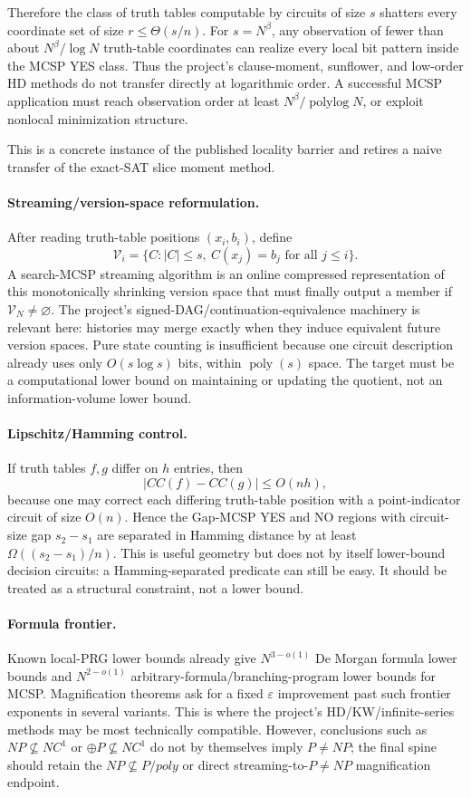 \documentclass[11pt]{article}
\begin{document}
Therefore the class of truth tables computable by circuits of size $s$ shatters every coordinate set of size $r\le\Theta(s/n)$. For $s=N^\beta$, any observation of fewer than about $N^\beta/\log N$ truth-table coordinates can realize every local bit pattern inside the MCSP YES class. Thus the project's clause-moment, sunflower, and low-order HD methods do not transfer directly at logarithmic order. A successful MCSP application must reach observation order at least $N^\beta/\operatorname{polylog}N$, or exploit nonlocal minimization structure.

This is a concrete instance of the published locality barrier and retires a naive transfer of the exact-SAT slice moment method.

\paragraph{Streaming/version-space reformulation.}
After reading truth-table positions $(x_i,b_i)$, define
\[\mathcal V_i=\{C:|C|\le s,\ C(x_j)=b_j\text{ for all }j\le i\}.\]
A search-MCSP streaming algorithm is an online compressed representation of this monotonically shrinking version space that must finally output a member if $\mathcal V_N\ne\varnothing$. The project's signed-DAG/continuation-equivalence machinery is relevant here: histories may merge exactly when they induce equivalent future version spaces. Pure state counting is insufficient because one circuit description already uses only $O(s\log s)$ bits, within $\operatorname{poly}(s)$ space. The target must be a computational lower bound on maintaining or updating the quotient, not an information-volume lower bound.

\paragraph{Lipschitz/Hamming control.}
If truth tables $f,g$ differ on $h$ entries, then
\[|CC(f)-CC(g)|\le O(nh),\]
because one may correct each differing truth-table position with a point-indicator circuit of size $O(n)$. Hence the Gap-MCSP YES and NO regions with circuit-size gap $s_2-s_1$ are separated in Hamming distance by at least $\Omega((s_2-s_1)/n)$. This is useful geometry but does not by itself lower-bound decision circuits: a Hamming-separated predicate can still be easy. It should be treated as a structural constraint, not a lower bound.

\paragraph{Formula frontier.}
Known local-PRG lower bounds already give $N^{3-o(1)}$ De Morgan formula lower bounds and $N^{2-o(1)}$ arbitrary-formula/branching-program lower bounds for MCSP. Magnification theorems ask for a fixed $\varepsilon$ improvement past such frontier exponents in several variants. This is where the project's HD/KW/infinite-series methods may be most technically compatible. However, conclusions such as $NP\not\subseteq NC^1$ or $\oplus P\not\subseteq NC^1$ do not by themselves imply $P\ne NP$; the final spine should retain the $NP\not\subseteq P/poly$ or direct streaming-to-$P\ne NP$ magnification endpoint.
\end{document}
